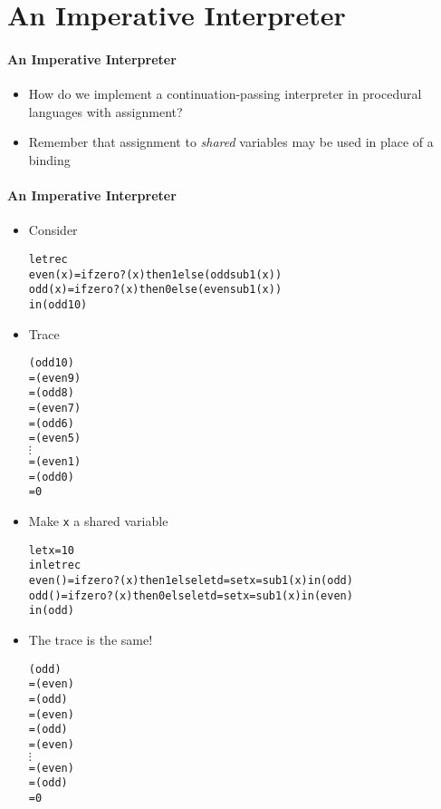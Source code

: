\documentclass{beamer}
\newcommand{\vdotss}{\(\vdots\)}
\begin{document}
\section{An Imperative Interpreter}

\begin{frame}[fragile]
\framesubtitle{An Imperative Interpreter}
\begin{scriptsize}
\begin{itemize}
\item<1-> How do we implement a continuation-passing interpreter in procedural languages with assignment?

\item<1-> Remember that assignment to \emph{shared} variables may be used in place of a binding

\end{itemize}
\end{scriptsize}
\end{frame}

\begin{frame}[fragile]
\framesubtitle{An Imperative Interpreter}
\begin{tiny}
\begin{itemize}
\item<1-> Consider
\begin{alltt}
letrec
  even(x) = if zero?(x) then 1 else (odd sub1(x))
  odd(x)   = if zero?(x) then 0 else (even sub1(x))
in (odd 10)
\end{alltt}

\item<2-> Trace
\begin{alltt}
(odd  10)
=  (even 9)
=  (odd   8)
=  (even 7)
=  (odd   6)
=  (even 5)
  \vdotss{}
=  (even 1)
=  (odd   0)
= 0
\end{alltt}

\item<3-> Make \texttt{x} a shared variable
\begin{alltt}
let x = 10
in letrec
       even() = if zero?(x) then 1 else let d = set x = sub1(x) in (odd)
       odd()   = if zero?(x) then 0 else let d = set x = sub1(x) in (even)
in (odd)
\end{alltt}

\item<4-> The trace is the same!
\begin{alltt}
(odd )
=  (even)
=  (odd)
=  (even)
=  (odd)
=  (even)
  \vdotss{}
=  (even)
=  (odd)
= 0
\end{alltt}

\end{itemize}
\end{tiny}
\end{frame}
\end{document}
